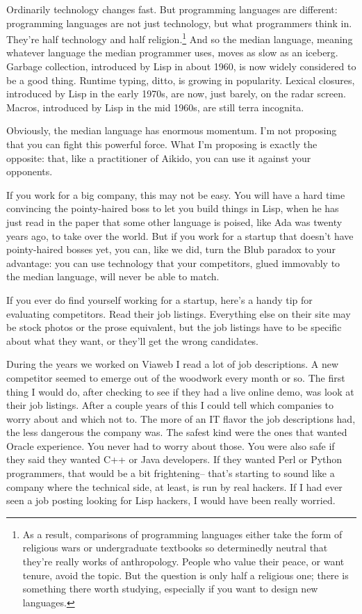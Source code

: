 Ordinarily technology changes fast. But programming languages are
different: programming languages are not just technology, but what
programmers think in. They're half technology and half religion.\footnote{As a result, comparisons of programming languages either take
the form of religious wars or undergraduate textbooks so determinedly
neutral that they're really works of anthropology. People who value
their peace, or want tenure, avoid the topic. But the question is only
half a religious one; there is something there worth studying,
especially if you want to design new languages.}
And so the median language, meaning whatever language the median
programmer uses, moves as slow as an iceberg. Garbage collection,
introduced by Lisp in about 1960, is now widely considered to be a good
thing. Runtime typing, ditto, is growing in popularity. Lexical
closures, introduced by Lisp in the early 1970s, are now, just barely,
on the radar screen. Macros, introduced by Lisp in the mid 1960s, are
still terra incognita.

Obviously, the median language has enormous momentum. I'm not proposing
that you can fight this powerful force. What I'm proposing is exactly
the opposite: that, like a practitioner of Aikido, you can use it
against your opponents.

If you work for a big company, this may not be easy. You will have a
hard time convincing the pointy-haired boss to let you build things in
Lisp, when he has just read in the paper that some other language is
poised, like Ada was twenty years ago, to take over the world. But if
you work for a startup that doesn't have pointy-haired bosses yet, you
can, like we did, turn the Blub paradox to your advantage: you can use
technology that your competitors, glued immovably to the median
language, will never be able to match.

If you ever do find yourself working for a startup, here's a handy tip
for evaluating competitors. Read their job listings. Everything else on
their site may be stock photos or the prose equivalent, but the job
listings have to be specific about what they want, or they'll get the
wrong candidates.

During the years we worked on Viaweb I read a lot of job descriptions. A
new competitor seemed to emerge out of the woodwork every month or so.
The first thing I would do, after checking to see if they had a live
online demo, was look at their job listings. After a couple years of
this I could tell which companies to worry about and which not to. The
more of an IT flavor the job descriptions had, the less dangerous the
company was. The safest kind were the ones that wanted Oracle
experience. You never had to worry about those. You were also safe if
they said they wanted C++ or Java developers. If they wanted Perl or
Python programmers, that would be a bit frightening-- that's starting to
sound like a company where the technical side, at least, is run by real
hackers. If I had ever seen a job posting looking for Lisp hackers, I
would have been really worried.